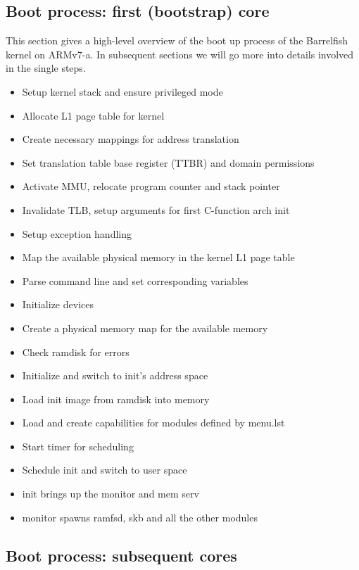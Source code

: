 \documentclass[a4paper,twoside]{report} %
\begin{document}
\subsection{Boot process: first (bootstrap) core}


This section gives a high-level overview of the boot up process of the
Barrelfish
kernel on ARMv7-a. In subsequent sections we will go more into details
involved
in the single steps.
\begin{itemize}
\item Setup kernel stack and ensure privileged mode
\item Allocate L1 page table for kernel
\item Create necessary mappings for address translation
\item Set translation table base register (TTBR) and domain
  permissions
\item Activate MMU, relocate program counter and stack pointer
\item Invalidate TLB, setup arguments for first C-function arch init
\item Setup exception handling
\item Map the available physical memory in the kernel L1 page table
\item Parse command line and set corresponding variables
\item Initialize devices
\item Create a physical memory map for the available memory
\item Check ramdisk for errors
\item Initialize and switch to init’s address space
\item Load init image from ramdisk into memory
\item Load and create capabilities for modules defined by menu.lst
\item Start timer for scheduling
\item Schedule init and switch to user space
\item init brings up the monitor and mem serv
\item monitor spawns ramfsd, skb and all the other modules
\end{itemize}

\subsection{Boot process: subsequent cores}
\end{document}

